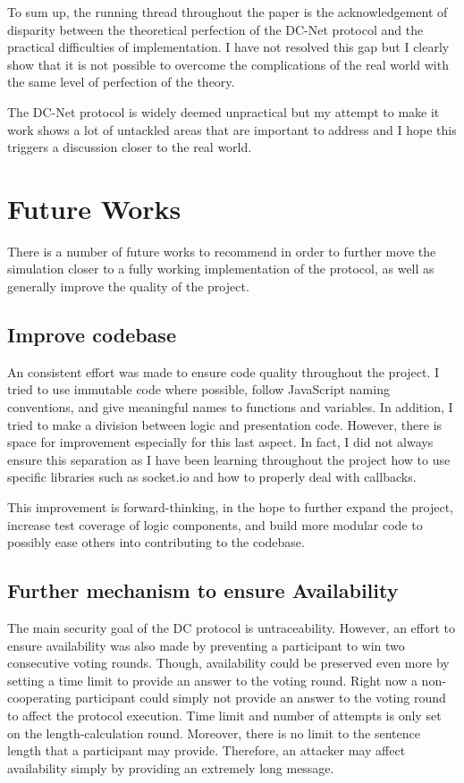 To sum up, the running thread throughout the paper is the acknowledgement of disparity between the theoretical perfection of the DC-Net protocol and the practical difficulties of implementation. I have not resolved this gap but I clearly show that it is not possible to overcome the complications of the real world with the same level of perfection of the theory. 

The DC-Net protocol is widely deemed unpractical but my attempt to make it work shows a lot of untackled areas that are important to address and I hope this triggers a discussion closer to the real world. 
 

 







\section{Future Works}
There is a number of future works to recommend in order to further move the simulation closer to a fully working implementation of the protocol, as well as generally improve the quality of the project.


\subsection{Improve codebase}
An consistent effort was made to ensure code quality throughout the project. I tried to use immutable code where possible, follow JavaScript naming conventions, and give meaningful names to functions and variables. In addition, I tried to make a division between logic and presentation code. However, there is space for improvement especially for this last aspect. In fact, I did not always ensure this separation as I have been learning throughout the project how to use specific libraries such as socket.io and how to properly deal with callbacks.

This improvement is forward-thinking, in the hope to further expand the project, increase test coverage of logic components, and build more modular code to possibly ease others into contributing to the codebase.


\subsection{Further mechanism to ensure Availability}
The main security goal of the DC protocol is untraceability. However, an effort to ensure availability was also made by preventing a participant to win two consecutive voting rounds. Though, availability could be preserved even more by setting a time limit to provide an answer to the voting round. Right now a non-cooperating participant could simply not provide an answer to the voting round to affect the protocol execution. Time limit and number of attempts is only set on the length-calculation round. Moreover, there is no limit to the sentence length that a participant may provide. Therefore, an attacker may affect availability simply by providing an extremely long message.

